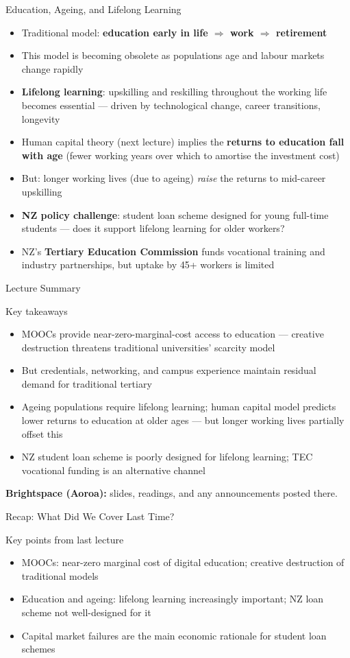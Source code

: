 \documentclass[aspectratio=169, 12pt]{beamer}
\newcommand{\recapslide}[1]{%
  \begin{frame}{Recap: What Did We Cover Last Time?}
    \begin{block}{Key points from last lecture}
      \begin{itemize}#1\end{itemize}
    \end{block}
  \end{frame}}
\newcommand{\summaryside}[1]{%
  \begin{frame}{Lecture Summary}
    \begin{exampleblock}{Key takeaways}
      \begin{itemize}#1\end{itemize}
    \end{exampleblock}
    \vspace{0.5em}
    {\footnotesize\textcolor{OtagoGold}{\textbf{Brightspace (Aoroa):}} slides, readings, and any announcements posted there.}
  \end{frame}}
\begin{document}
\begin{frame}{Education, Ageing, and Lifelong Learning}
  \begin{itemize}
    \item Traditional model: \textbf{education early in life $\Rightarrow$ work $\Rightarrow$ retirement}
    \item This model is becoming obsolete as populations age and labour markets change rapidly
    \item \textbf{Lifelong learning}: upskilling and reskilling throughout the working life
          becomes essential --- driven by technological change, career transitions, longevity
    \item Human capital theory (next lecture) implies the \textbf{returns to education fall
          with age} (fewer working years over which to amortise the investment cost)
    \item But: longer working lives (due to ageing) \emph{raise} the returns to mid-career
          upskilling
    \item \textbf{NZ policy challenge}: student loan scheme designed for young full-time
          students --- does it support lifelong learning for older workers?
    \item NZ's \textbf{Tertiary Education Commission} funds vocational training and industry
          partnerships, but uptake by 45+ workers is limited
  \end{itemize}
\end{frame}

\summaryside{
  \item MOOCs provide near-zero-marginal-cost access to education --- creative destruction threatens traditional universities' scarcity model
  \item But credentials, networking, and campus experience maintain residual demand for traditional tertiary
  \item Ageing populations require lifelong learning; human capital model predicts lower returns to education at older ages --- but longer working lives partially offset this
  \item NZ student loan scheme is poorly designed for lifelong learning; TEC vocational funding is an alternative channel
}

\recapslide{
  \item MOOCs: near-zero marginal cost of digital education; creative destruction of traditional models
  \item Education and ageing: lifelong learning increasingly important; NZ loan scheme not well-designed for it
  \item Capital market failures are the main economic rationale for student loan schemes
}
\end{document}
